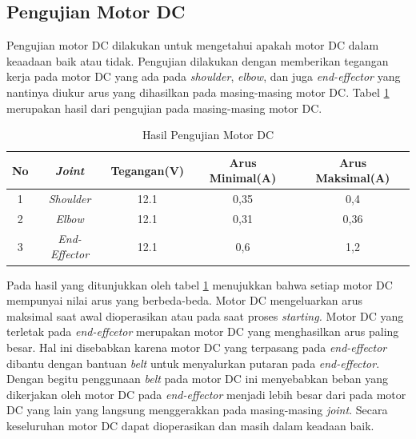 \subsection{Pengujian Motor DC}
Pengujian motor DC dilakukan untuk mengetahui apakah motor DC dalam keaadaan baik atau tidak. Pengujian dilakukan dengan memberikan tegangan kerja pada motor DC yang ada pada \textit{shoulder}, \textit{elbow}, dan juga \textit{end-effector} yang nantinya diukur arus yang dihasilkan pada masing-masing motor DC. Tabel \ref{tbl.motordc} merupakan hasil dari pengujian pada masing-masing motor DC.

\begin{table}[h]
		\centering
	\caption{Hasil Pengujian Motor DC}
	\label{tbl.motordc}
	\begin{tabular}{|c|c|c|c|c|}
		\hline
		\rowcolor[HTML]{9B9B9B} 
		No & \textit{Joint}        & Tegangan(V) & Arus Minimal(A) & Arus Maksimal(A)\\ \hline
		1  & \textit{Shoulder}     & 12.1        &   0,35       & 0,4 \\ \hline
		2  & \textit{Elbow}        & 12.1        &   0,31       & 0,36\\ \hline
		3  & \textit{End-Effector} & 12.1        &   0,6      & 1,2\\ \hline
	\end{tabular}
\end{table}

Pada hasil yang ditunjukkan oleh tabel \ref{tbl.motordc} menujukkan bahwa setiap motor DC mempunyai nilai arus yang berbeda-beda. Motor DC mengeluarkan arus maksimal saat awal dioperasikan atau pada saat proses \textit{starting. }Motor DC yang terletak pada \textit{end-effcetor} merupakan motor DC yang menghasilkan arus paling besar. Hal ini disebabkan karena motor DC yang terpasang pada \textit{end-effector} dibantu dengan bantuan \textit{belt} untuk menyalurkan putaran pada\textit{ end-effector}. Dengan begitu penggunaan \textit{belt} pada motor DC ini menyebabkan beban yang dikerjakan oleh motor DC pada \textit{end-effector} menjadi lebih besar dari pada motor DC yang lain yang langsung menggerakkan pada masing-masing \textit{joint}. Secara keseluruhan motor DC dapat dioperasikan dan masih dalam keadaan baik.

